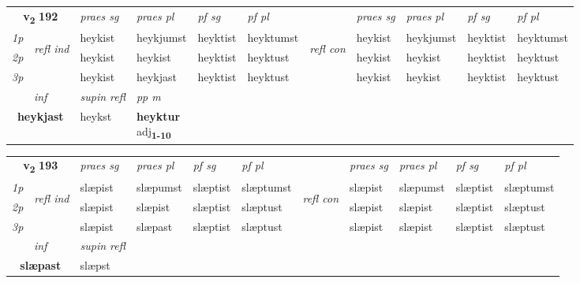 \noindent
\begin{tabular}{lllllllllll} \toprule
\multicolumn{2}{c}{\textbf{v{\textsubscript{2}}} \Large{\textbf{192}}}  &  \textit{praes sg}  & \textit{praes pl}  &\textit{ pf sg} & \textit{pf pl} &  &  \textit{praes sg}  & \textit{praes pl}  & \textit{pf sg} & \textit{pf pl } \\*
	\cmidrule{3-6} \cmidrule{8-11}
 {\textit{1p}} & \multirow{3}{*}{\begin{turn}{90}\textit{refl ind}\end{turn}}  & heykist & heykjumst & heyktist & heyktumst & \multirow{3}{*}{\begin{turn}{90}\textit{refl con}\end{turn}}  &heykist & heykjumst & heyktist & heyktumst \\*
 {\textit{2p}} &  & heykist & heykist & heyktist & heyktust & &heykist & heykist & heyktist & heyktust \\*
 {\textit{3p}}  & & heykist & heykjast & heyktist & heyktust & & heykist & heykist& heyktist & heyktust \\*
\cmidrule{3-6} \cmidrule{8-11}

   \multicolumn{2}{c}{\textit{inf}}       & \textit{supin refl} & \textit{pp m} \\*
  \multicolumn{2}{c}{\textbf{heykjast}}        & heykst & \specialcell{\textbf{heyktur} \\ adj\textbf{\textsubscript{1-10}}} \\*
\end{tabular}

\noindent
\begin{tabular}{lllllllllll} \toprule
\multicolumn{2}{c}{\textbf{v{\textsubscript{2}}} \Large{\textbf{193}}}  &  \textit{praes sg}  & \textit{praes pl}  &\textit{ pf sg} & \textit{pf pl} &  &  \textit{praes sg}  & \textit{praes pl}  & \textit{pf sg} & \textit{pf pl } \\*
	\cmidrule{3-6} \cmidrule{8-11}
 {\textit{1p}} & \multirow{3}{*}{\begin{turn}{90}\textit{refl ind}\end{turn}}  & slæpist & slæpumst & slæptist & slæptumst & \multirow{3}{*}{\begin{turn}{90}\textit{refl con}\end{turn}}  &slæpist & slæpumst & slæptist & slæptumst \\*
 {\textit{2p}} &  & slæpist & slæpist & slæptist & slæptust & &slæpist & slæpist & slæptist & slæptust \\*
 {\textit{3p}}  & & slæpist & slæpast & slæptist & slæptust & & slæpist & slæpist& slæptist & slæptust \\*
\cmidrule{3-6} \cmidrule{8-11}

   \multicolumn{2}{c}{\textit{inf}}       & \textit{supin refl}  \\*
  \multicolumn{2}{c}{\textbf{slæpast}}        & slæpst  \\*
\end{tabular}


